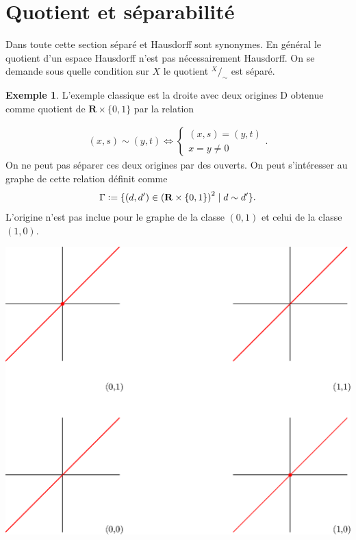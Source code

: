 \documentclass[12pt]{book}
\newcommand{\defeq}{\vcentcolon=}
\theoremstyle{definition}
\newtheorem{example}[lemma]{Exemple}
\theoremstyle{remark}
\newcommand*\quot[2]{{^{\textstyle #1}\big/_{\textstyle #2}}}
\begin{document}
	\section{Quotient et séparabilité}
	Dans toute cette section séparé et Hausdorff sont synonymes. En général le quotient d'un espace Hausdorff n'est pas nécessairement Hausdorff. On se demande sous quelle condition sur $X$ le quotient $\quot{X}{\sim}$ est séparé.
	\begin{example}
		L'exemple classique est la droite avec deux origines D obtenue comme quotient de $\mathbf{R}\times \{0,1\}$ par la relation \\
		\begin{minipage}{0.5\textwidth}
			\begin{align*}
				(x,s) \sim (y,t) \iff \begin{cases}
					(x,s) = (y,t) \\
					x = y \neq 0
				\end{cases}
			.\end{align*}
			On ne peut pas séparer ces deux origines par des ouverts. On peut s'intéresser au graphe de cette relation définit comme \[\Gamma \defeq \{(d,d') \in {(\mathbf{R}\times \{0,1\})}^2  \;|\; d\sim d'\}.\] L'origine n'est pas inclue pour le graphe de la classe $(0,1)$ et celui de la classe $(1,0)$.
		\end{minipage}
		\hfill
		\begin{minipage}{0.5\textwidth}
			\centering
			\includegraphics[scale=0.5]{graph.eps}
		\end{minipage}
	\end{example}
\end{document}
